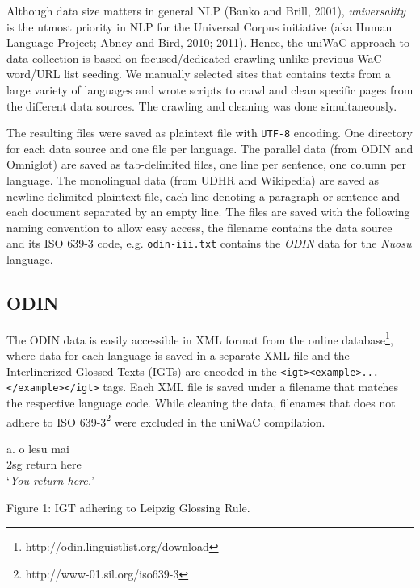 \documentclass[11pt]{article}
\begin{document}
Although data size matters in general NLP (Banko and Brill, 2001), \emph{universality} is the utmost priority in NLP for the Universal Corpus initiative (aka Human Language Project; Abney and Bird, 2010; 2011). Hence, the uniWaC approach to data collection is based on focused/dedicated crawling unlike previous WaC word/URL list seeding. We manually selected sites that contains texts from a large variety of languages and wrote scripts to crawl and clean specific pages from the different data sources. The crawling and cleaning was done simultaneously. 

The resulting files were saved as plaintext file with \texttt{UTF-8} encoding. One directory for each data source and one file per language. The parallel data (from ODIN and Omniglot) are saved as tab-delimited files, one line per sentence, one column per language. The monolingual data (from UDHR and Wikipedia) are saved as newline delimited plaintext file, each line denoting a paragraph or sentence and each document separated by an empty line. The files are saved with the following naming convention to allow easy access, the filename contains the data source and its ISO 639-3 code, e.g. \texttt{odin-iii.txt} contains the \emph{ODIN} data for the \emph{Nuosu} language.

\subsection{ODIN}

The ODIN data is easily accessible in XML format from the online database\footnote{http://odin.linguistlist.org/download}, where data for each language is saved in a separate XML file and the Interlinerized Glossed Texts (IGTs) are encoded in the \texttt{<igt><example>...</example></igt>} tags. Each XML file is saved under a filename that matches the respective language code. While cleaning the data, filenames that does not adhere to ISO 639-3\footnote{http://www-01.sil.org/iso639-3} were excluded in the uniWaC compilation.

\begin{minipage}{\columnwidth}

a. \quad o lesu mai \\
\indent \qquad 2sg return here \\
\indent \qquad `\emph{You return here.}' \\

\centerline{Figure 1: IGT adhering to Leipzig Glossing Rule.}
\end{minipage}
\end{document}
